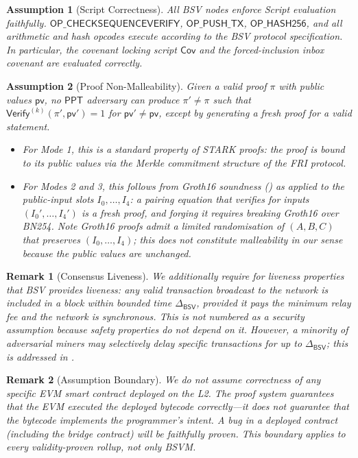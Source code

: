 \documentclass[11pt,a4paper]{article}
\newtheorem{remark}{Remark}[section]
\newtheorem{assumption}{Assumption}[section]
\newcommand{\PPT}{\mathsf{PPT}}
\newcommand{\Verify}{\mathsf{Verify}}
\newcommand{\Cov}{\mathsf{Cov}}
\newcommand{\BSV}{\mathsf{BSV}}
\begin{document}
\begin{assumption}[Script Correctness]\label{ass:script}
All BSV nodes enforce Script evaluation faithfully. $\mathsf{OP\_CHECKSEQUENCEVERIFY}$, $\mathsf{OP\_PUSH\_TX}$, $\mathsf{OP\_HASH256}$, and all arithmetic and hash opcodes execute according to the BSV protocol specification. In particular, the covenant locking script $\Cov$ and the forced-inclusion inbox covenant are evaluated correctly.
\end{assumption}

\begin{assumption}[Proof Non-Malleability]\label{ass:non-malleable}
Given a valid proof $\pi$ with public values $\mathsf{pv}$, no $\PPT$ adversary can produce $\pi' \neq \pi$ such that $\Verify^{(k)}(\pi', \mathsf{pv}') = 1$ for $\mathsf{pv}' \neq \mathsf{pv}$, except by generating a fresh proof for a valid statement.
\begin{itemize}[nosep]
    \item For Mode 1, this is a standard property of STARK proofs: the proof is bound to its public values via the Merkle commitment structure of the FRI protocol.
    \item For Modes 2 and 3, this follows from Groth16 soundness () as applied to the public-input slots $I_0, \ldots, I_4$: a pairing equation that verifies for inputs $(I_0', \ldots, I_4')$ is a fresh proof, and forging it requires breaking Groth16 over BN254. Note Groth16 proofs admit a limited randomisation of $(A, B, C)$ that preserves $(I_0, \ldots, I_4)$; this \emph{does not} constitute malleability in our sense because the public values are unchanged.
\end{itemize}
\end{assumption}

\begin{remark}[Consensus Liveness]\label{rem:liveness-assumption}
We additionally require for liveness properties that BSV provides liveness: any valid transaction broadcast to the network is included in a block within bounded time $\Delta_{\BSV}$, provided it pays the minimum relay fee and the network is synchronous. This is not numbered as a security assumption because safety properties do not depend on it. However, a minority of adversarial miners may selectively delay specific transactions for up to $\Delta_{\BSV}$; this is addressed in .
\end{remark}

\begin{remark}[Assumption Boundary]\label{rem:boundary}
We do \emph{not} assume correctness of any specific EVM smart contract deployed on the L2. The proof system guarantees that the EVM executed the deployed bytecode correctly---it does not guarantee that the bytecode implements the programmer's intent. A bug in a deployed contract (including the bridge contract) will be faithfully proven. This boundary applies to every validity-proven rollup, not only BSVM.
\end{remark}
\end{document}
